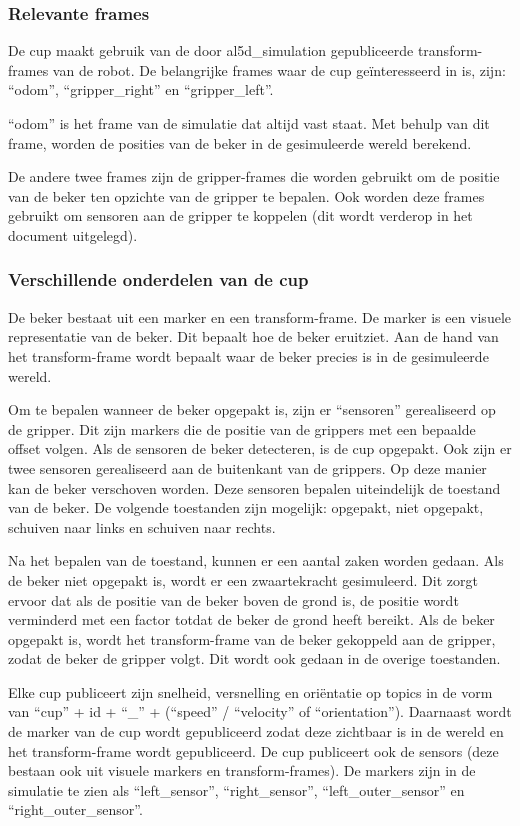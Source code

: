 \documentclass[11pt,titlepage]{article}
\begin{document}
\subsubsection{Relevante frames}
De cup maakt gebruik van de door al5d\_simulation gepubliceerde transform-frames van de robot. De belangrijke frames waar de cup geïnteresseerd in is, zijn: ``odom'', ``gripper\_right'' en ``gripper\_left''.

``odom'' is het frame van de simulatie dat altijd vast staat. Met behulp van dit frame, worden de posities van de beker in de gesimuleerde wereld berekend.

De andere twee frames zijn de gripper-frames die worden gebruikt om de positie van de beker ten opzichte van de gripper te bepalen. Ook worden deze frames gebruikt om sensoren aan de gripper te koppelen (dit wordt verderop in het document uitgelegd).

\subsubsection{Verschillende onderdelen van de cup}

De beker bestaat uit een marker en een transform-frame. De marker is een visuele representatie van de beker. Dit bepaalt hoe de beker eruitziet. Aan de hand van het transform-frame wordt bepaalt waar de beker precies is in de gesimuleerde wereld.

Om te bepalen wanneer de beker opgepakt is, zijn er ``sensoren'' gerealiseerd op de gripper. Dit zijn markers die de positie van de grippers met een bepaalde offset volgen. Als de sensoren de beker detecteren, is de cup opgepakt. Ook zijn er twee sensoren gerealiseerd aan de buitenkant van de grippers. Op deze manier kan de beker verschoven worden. Deze sensoren bepalen uiteindelijk de toestand van de beker. De volgende toestanden zijn mogelijk: opgepakt, niet opgepakt, schuiven naar links en schuiven naar rechts.

Na het bepalen van de toestand, kunnen er een aantal zaken worden gedaan. Als de beker niet opgepakt is, wordt er een zwaartekracht gesimuleerd. Dit zorgt ervoor dat als de positie van de beker boven de grond is, de positie wordt verminderd met een factor totdat de beker de grond heeft bereikt. Als de beker opgepakt is, wordt het transform-frame van de beker gekoppeld aan de gripper, zodat de beker de gripper volgt. Dit wordt ook gedaan in de overige toestanden.

Elke cup publiceert zijn snelheid, versnelling en oriëntatie op topics in de vorm van ``cup'' + id + ``\_'' + (``speed'' / ``velocity'' of ``orientation''). Daarnaast wordt de marker van de cup wordt gepubliceerd zodat deze zichtbaar is in de wereld en het transform-frame wordt gepubliceerd. De cup publiceert ook de sensors (deze bestaan ook uit visuele markers en transform-frames). De markers zijn in de simulatie te zien als ``left\_sensor'', ``right\_sensor'', ``left\_outer\_sensor'' en ``right\_outer\_sensor''. 
\end{document}
